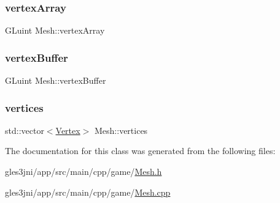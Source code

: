 \mbox{\label{class_mesh_a8b16232ade5f530ce223466d007eb189}} 
\subsubsection{\texorpdfstring{vertex\+Array}{vertexArray}}
{\footnotesize\ttfamily G\+Luint Mesh\+::vertex\+Array\hspace{0.3cm}{\ttfamily [private]}}

\mbox{\label{class_mesh_ab929a49165b786e7c35d982713d6eca3}} 
\subsubsection{\texorpdfstring{vertex\+Buffer}{vertexBuffer}}
{\footnotesize\ttfamily G\+Luint Mesh\+::vertex\+Buffer\hspace{0.3cm}{\ttfamily [private]}}

\mbox{\label{class_mesh_a6465a888c97232a39e12aad008c969c3}} 
\subsubsection{\texorpdfstring{vertices}{vertices}}
{\footnotesize\ttfamily std\+::vector$<$\hyperlink{struct_vertex}{Vertex}$>$ Mesh\+::vertices\hspace{0.3cm}{\ttfamily [private]}}



The documentation for this class was generated from the following files\+:\begin{DoxyCompactItemize}
\item 
gles3jni/app/src/main/cpp/game/\hyperlink{_mesh_8h}{Mesh.\+h}\item 
gles3jni/app/src/main/cpp/game/\hyperlink{_mesh_8cpp}{Mesh.\+cpp}\end{DoxyCompactItemize}
